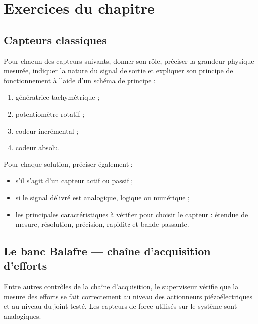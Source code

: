 
\section{Exercices du chapitre}\label{sec:elec-exercices}

\subsection{Capteurs classiques}

Pour chacun des capteurs suivants, donner son rôle, préciser la grandeur physique mesurée, indiquer la nature du signal de sortie et expliquer son principe de fonctionnement à l'aide d'un schéma de principe :
\begin{enumerate}
  \item génératrice tachymétrique ;
  \item potentiomètre rotatif ;
  \item codeur incrémental ;
  \item codeur absolu.
\end{enumerate}

Pour chaque solution, préciser également :
\begin{itemize}
  \item s'il s'agit d'un capteur actif ou passif ;
  \item si le signal délivré est analogique, logique ou numérique ;
  \item les principales caractéristiques à vérifier pour choisir le capteur : étendue de mesure, résolution, précision, rapidité et bande passante.
\end{itemize}

\subsection{Le banc Balafre — chaîne d'acquisition d'efforts}

Entre autres contrôles de la chaîne d'acquisition, le superviseur vérifie que la mesure des efforts se fait correctement au niveau des actionneurs piézoélectriques et au niveau du joint testé. Les capteurs de force utilisés sur le système sont analogiques.

